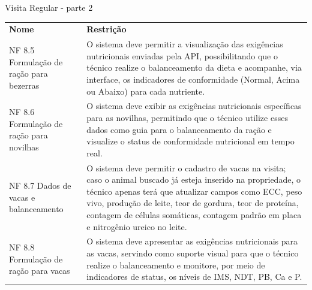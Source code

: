 \begin{tabframed}[!htb]
  \caption{Visita Regular - parte 2}
  \label{quad:requisitoVisitaRegularParte2}
  \renewcommand{\arraystretch}{1.5}
  \begin{tabular}{|l|l|}
    \cline{1-2}

    \textbf{Nome}                                                                       &
    \textbf{Restrição}
    \\ \cline{1-2}

    \multicolumn{1}{|p{3.2cm}|}{\raggedright NF 8.5 Formulação de ração para bezerras} &
    \multicolumn{1}{|p{12cm}|}{\raggedright O sistema deve permitir a visualização das exigências nutricionais enviadas pela \gls{API}, possibilitando que o técnico realize o balanceamento da dieta e acompanhe, via interface, os indicadores de conformidade (Normal, Acima ou Abaixo) para cada nutriente.}
    \\ \cline{1-2}

    \multicolumn{1}{|p{3cm}|}{\raggedright NF 8.6 Formulação de ração para novilhas}   &
    \multicolumn{1}{|p{12cm}|}{\raggedright O sistema deve exibir as exigências nutricionais específicas para as novilhas, permitindo que o técnico utilize esses dados como guia para o balanceamento da ração e visualize o status de conformidade nutricional em tempo real.}
    \\ \cline{1-2}

    \multicolumn{1}{|p{3cm}|}{\raggedright NF 8.7 Dados de vacas e balanceamento}      &
    \multicolumn{1}{|p{12cm}|}{\raggedright O sistema deve permitir o cadastro de vacas na visita; caso o animal buscado já esteja inserido na propriedade, o técnico apenas terá que atualizar campos como \gls{ECC}, peso vivo, produção de leite, teor de gordura, teor de proteína, contagem de células somáticas, contagem padrão em placa e nitrogênio ureico no leite.}
    \\ \cline{1-2}

    \multicolumn{1}{|p{3cm}|}{\raggedright NF 8.8 Formulação de ração para vacas}      &
    \multicolumn{1}{|p{12cm}|}{\raggedright O sistema deve apresentar as exigências nutricionais para as vacas, servindo como suporte visual para que o técnico realize o balanceamento e monitore, por meio de indicadores de status, os níveis de \gls{IMS}, \gls{NDT}, \gls{PB}, \gls{Ca} e \gls{P}.}
    \\ \cline{1-2}
  \end{tabular}
  \fonte{} %
\end{tabframed}

